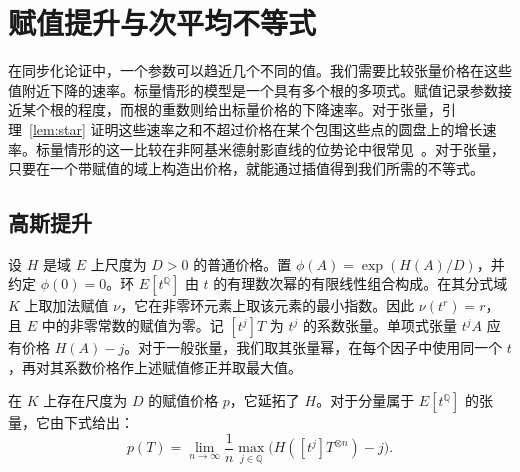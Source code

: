\section{赋值提升与次平均不等式}\label{sec:valued}

在同步化论证中，一个参数可以趋近几个不同的值。我们需要比较张量价格在这些值附近下降的速率。标量情形的模型是一个具有多个根的多项式。赋值记录参数接近某个根的程度，而根的重数则给出标量价格的下降速率。对于张量，引理~\ref{lem:star} 证明这些速率之和不超过价格在某个包围这些点的圆盘上的增长速率。标量情形的这一比较在非阿基米德射影直线的位势论中很常见~\cite{BakerRumely}。对于张量，只要在一个带赋值的域上构造出价格，就能通过插值得到我们所需的不等式。

\subsection{高斯提升}

设 $H$ 是域 $E$ 上尺度为 $D>0$ 的普通价格。置 $\phi(A)=\exp(H(A)/D)$，并约定 $\phi(0)=0$。环 $E[t^{\mathbb Q}]$ 由 $t$ 的有理数次幂的有限线性组合构成。在其分式域 $K$ 上取加法赋值 $\nu$，它在非零环元素上取该元素的最小指数。因此 $\nu(t^r)=r$，且 $E$ 中的非零常数的赋值为零。记 $[t^j]T$ 为 $t^j$ 的系数张量。单项式张量 $t^j A$ 应有价格 $H(A)-j$。对于一般张量，我们取其张量幂，在每个因子中使用同一个 $t$，再对其系数价格作上述赋值修正并取最大值。

\begin{theorem}[高斯提升]\label{thm:gauss}
在 $K$ 上存在尺度为 $D$ 的赋值价格 $p$，它延拓了 $H$。对于分量属于 $E[t^{\mathbb Q}]$ 的张量，它由下式给出：
\begin{equation}\label{eq:gauss-price}
 p(T)=\lim_{n\to\infty}\frac1n
       \max_{j\in\mathbb Q}\bigl(H([t^j]T^{\otimes n})-j\bigr).
\end{equation}
\end{theorem}

